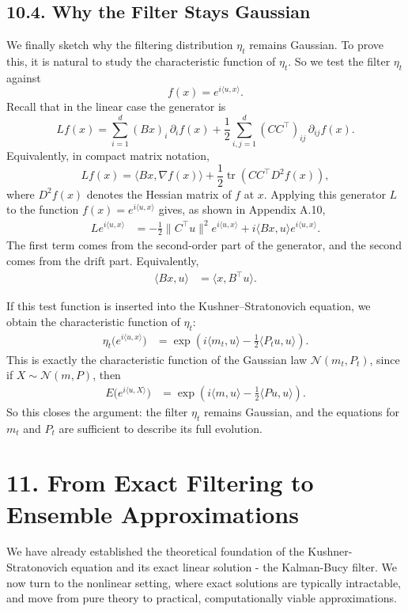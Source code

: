 \documentclass[11pt]{article}
\theoremstyle{definition}
\theoremstyle{remark}
\begin{document}
\subsection*{10.4. Why the Filter Stays Gaussian}
We finally sketch why the filtering distribution $\eta_t$ remains Gaussian. To prove this, it is natural to study the characteristic function of $\eta_t$. So we test the filter $\eta_t$ against
\[
f(x)=e^{i\langle u,x\rangle}.
\]
Recall that in the linear case the generator is
\[
Lf(x)=\sum_{i=1}^d (Bx)_i\,\partial_i f(x)+\frac12\sum_{i,j=1}^d (CC^\top)_{ij}\,\partial_{ij}f(x).
\]
Equivalently, in compact matrix notation,
\[
Lf(x)=\langle Bx,\nabla f(x)\rangle+\frac12\operatorname{tr}(CC^\top D^2f(x)),
\]
where $D^2f(x)$ denotes the Hessian matrix of $f$ at $x$.
Applying this generator $L$ to the function $f(x)=e^{i\langle u,x\rangle}$ gives, as shown in Appendix A.10,
\begin{align*}
Le^{i\langle u,x\rangle}
&=
-\frac12\|C^\top u\|^2 e^{i\langle u,x\rangle}
+i\langle Bx,u\rangle e^{i\langle u,x\rangle}.
\end{align*}
The first term comes from the second-order part of the generator, and the second comes from the drift part. Equivalently,
\begin{align*}
\langle Bx,u\rangle&=\langle x,B^\top u\rangle.
\end{align*}

If this test function is inserted into the Kushner--Stratonovich equation, we obtain the characteristic function of $\eta_t$:
\begin{align*}
\eta_t\bigl(e^{i\langle u,x\rangle}\bigr)
&=
\exp\left(i\langle m_t,u\rangle-\frac12\langle P_tu,u\rangle\right).
\end{align*}
This is exactly the characteristic function of the Gaussian law $\mathcal N(m_t,P_t)$, since if $X\sim\mathcal N(m,P)$, then
\begin{align*}
E\bigl(e^{i\langle u,X\rangle}\bigr)
&=
\exp\left(i\langle m,u\rangle-\frac12\langle Pu,u\rangle\right).
\end{align*}
So this closes the argument: the filter $\eta_t$ remains Gaussian, and the equations for $m_t$ and $P_t$ are sufficient to describe its full evolution.

\section*{11. From Exact Filtering to Ensemble Approximations}
We have already established the theoretical foundation of the Kushner-Stratonovich equation and its exact linear solution - the Kalman-Bucy filter. We now turn to the nonlinear setting, where exact solutions are typically intractable, and move from pure theory to practical, computationally viable approximations.
\end{document}
